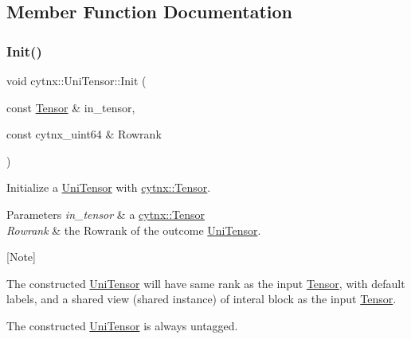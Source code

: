\subsection{Member Function Documentation}
\mbox{\label{classcytnx_1_1UniTensor_ae94c74dc715d1ed3aa409a894d4dddfb}} 
\subsubsection{\texorpdfstring{Init()}{Init()}\hspace{0.1cm}{\footnotesize\ttfamily [1/2]}}
{\footnotesize\ttfamily void cytnx\+::\+Uni\+Tensor\+::\+Init (\begin{DoxyParamCaption}\item[{const \hyperlink{classcytnx_1_1Tensor}{Tensor} \&}]{in\+\_\+tensor,  }\item[{const cytnx\+\_\+uint64 \&}]{Rowrank }\end{DoxyParamCaption})\hspace{0.3cm}{\ttfamily [inline]}}



Initialize a \hyperlink{classcytnx_1_1UniTensor}{Uni\+Tensor} with \hyperlink{classcytnx_1_1Tensor}{cytnx\+::\+Tensor}. 


\begin{DoxyParams}{Parameters}
{\em in\+\_\+tensor} & a \hyperlink{classcytnx_1_1Tensor}{cytnx\+::\+Tensor} \\
\hline
{\em Rowrank} & the Rowrank of the outcome \hyperlink{classcytnx_1_1UniTensor}{Uni\+Tensor}.\\
\hline
\end{DoxyParams}
\mbox{[}Note\mbox{]}
\begin{DoxyEnumerate}
\item The constructed \hyperlink{classcytnx_1_1UniTensor}{Uni\+Tensor} will have same rank as the input \hyperlink{classcytnx_1_1Tensor}{Tensor}, with default labels, and a shared view (shared instance) of interal block as the input \hyperlink{classcytnx_1_1Tensor}{Tensor}.
\item The constructed \hyperlink{classcytnx_1_1UniTensor}{Uni\+Tensor} is always untagged. 
\end{DoxyEnumerate}\mbox{\label{classcytnx_1_1UniTensor_ad6ba5c7452b4d83bfbaa9770060f8a63}} 
